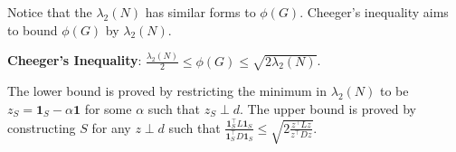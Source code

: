 Notice that the $\lambda_2(N)$ has similar forms to $\phi(G)$. Cheeger's inequality aims to bound $\phi(G)$ by $\lambda_2(N)$.

\textbf{Cheeger's Inequality}: $\frac{\lambda_2(N)}{2} \le \phi(G) \le \sqrt{2\lambda_2(N)}$.

The lower bound is proved by restricting the minimum in $\lambda_2(N)$ to be $z_S = \boldsymbol{1}_S - \alpha \boldsymbol{1}$ for some $\alpha$ such that $z_S \perp d$. The upper bound is proved by constructing $S$ for any $z \perp d$ such that $\frac{\boldsymbol{1}_S^\top L \boldsymbol{1}_S}{\boldsymbol{1}_S^\top D \boldsymbol{1}_S} \le \sqrt{2 \frac{z^\top L z}{z^\top D z}}$.

